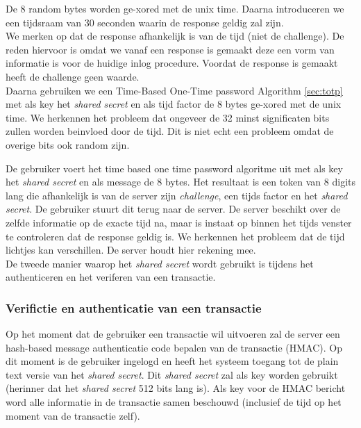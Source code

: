 \documentclass[11pt]{article}
\begin{document}
De 8 random bytes worden ge-xored met de unix time. Daarna introduceren we een  tijdsraam van 30 seconden waarin de response geldig zal zijn.\\

We merken op dat de response afhankelijk is van de tijd (niet de challenge). De reden hiervoor is omdat we vanaf een response is gemaakt deze een vorm van informatie is voor de huidige inlog procedure. Voordat de response is gemaakt  heeft de challenge geen waarde.\\

Daarna gebruiken we een Time-Based One-Time password Algorithm \ref{sec:totp} met als key het \emph{shared secret} en als tijd factor de 8 bytes ge-xored met de unix time. We herkennen het probleem dat ongeveer de 32 minst significaten bits zullen worden beinvloed door de tijd. Dit is niet echt een probleem omdat de overige bits ook random zijn.

De gebruiker voert het time based one time password algoritme uit met als key het \emph{shared secret} en als message de 8 bytes. Het resultaat is een token van 8 digits lang die afhankelijk is van de server zijn \emph{challenge}, een tijds factor en het \emph{shared secret}. De gebruiker stuurt dit terug naar de server. De server beschikt over de zelfde informatie op de exacte tijd na, maar is instaat op binnen het tijds venster te controleren dat de response geldig is. We herkennen het probleem dat de tijd lichtjes kan verschillen. De server houdt hier rekening mee.\\

De tweede manier waarop het \emph{shared secret} wordt gebruikt is tijdens het authenticeren en het veriferen van een transactie.

\subsubsection{Verifictie en authenticatie van een transactie}
Op het moment dat de gebruiker een transactie wil uitvoeren zal de server een hash-based message authenticatie code bepalen van de transactie (HMAC). Op dit moment is de gebruiker ingelogd en heeft het systeem toegang tot de plain text versie van het \emph{shared secret}. Dit \emph{shared secret} zal als key worden gebruikt (herinner dat het \emph{shared secret} 512 bits lang is). Als key voor de HMAC bericht word alle informatie in de transactie samen beschouwd (inclusief de tijd op het moment van de transactie zelf). \\
\end{document}
